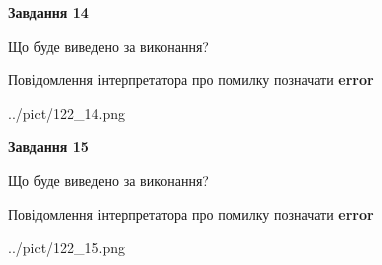 \documentclass[11pt, ukrainian]{article}
\begin{document}
{\begin {large}
{\begin {center}\textbf{Завдання 14}\end {center}}\par
Що буде виведено за виконання? \par
Повідомлення інтерпретатора про помилку позначати \textbf{error}

\begin{center}
	{../pict/122_14.png}
\end{center}
\newpage

{\begin {center}\textbf{Завдання 15}\end {center}}\par
Що буде виведено за виконання? \par
Повідомлення інтерпретатора про помилку позначати \textbf{error}

\begin{center}
	{../pict/122_15.png}
\end{center}
\newpage

\end {large}}
\end{document}
